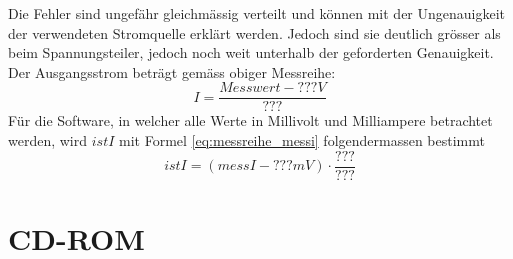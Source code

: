 Die Fehler sind ungefähr gleichmässig verteilt und können mit der Ungenauigkeit der verwendeten Stromquelle erklärt werden. Jedoch sind sie deutlich grösser als beim Spannungsteiler, jedoch noch weit unterhalb der geforderten Genauigkeit. Der Ausgangsstrom beträgt gemäss obiger Messreihe:
\begin{equation}
	I=\frac{Messwert-???V}{???}
\label{eq:messreihe_messi}
\end{equation}
Für die Software, in welcher alle Werte in Millivolt und Milliampere betrachtet werden, wird $istI$ mit Formel \ref{eq:messreihe_messi} folgendermassen bestimmt
\begin{equation}
	istI=\left(messI-???mV\right)\cdot\frac{???}{???}
\label{eq:messreihe_messi_sw}
\end{equation}


\newpage
\section{CD-ROM}
